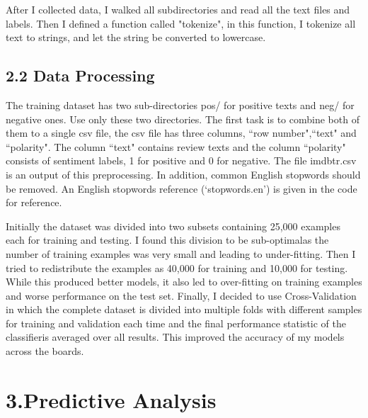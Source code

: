 \documentclass[11pt]{article}
\begin{document}
After I collected data, I walked all subdirectories and read all the text files and labels. Then I defined a function called "tokenize", in this function, I tokenize all text to strings, and let the string be converted to lowercase.

\subsection*{2.2 Data Processing}
\hspace{1.5em}The training dataset has two sub-directories pos/ for positive texts and neg/ for negative ones. Use only these two directories. The first task is to combine both of them to a single csv file, the csv file has three columns, ``row number",``text" and ``polarity". The column ``text" contains review texts and the column ``polarity" consists of sentiment labels, 1 for positive and 0 for negative. The file imdbtr.csv is an output of this preprocessing. In addition, common English stopwords should be removed. An English stopwords reference (`stopwords.en') is given in the code for reference.

Initially the dataset was divided into two subsets containing 25,000 examples each for training and testing. I found this division to be sub-optimalas the number of training examples was very small and leading to under-fitting. Then I tried to redistribute the examples as 40,000 for training and 10,000 for testing. While this produced better models, it also led to over-fitting on training examples and worse performance on the test set. Finally, I decided to use Cross-Validation in which the complete dataset is divided into multiple folds with different samples for training and validation each time and the final performance statistic of the classifieris averaged over all results. This improved the accuracy of my models across the boards.
\section*{3.Predictive Analysis}
\end{document}
